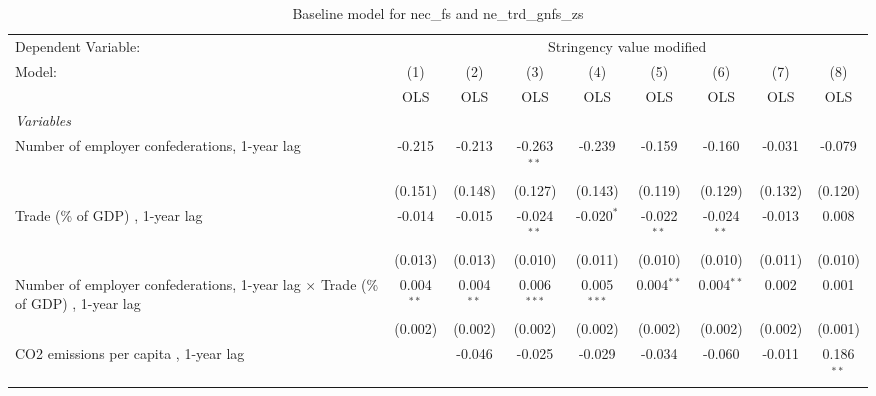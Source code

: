 
\begin{table}[htbp]
   \caption{Baseline model for nec\_fs and ne\_trd\_gnfs\_zs}
   \centering
   \begin{tabular}{lcccccccc}
      \toprule
      Dependent Variable: & \multicolumn{8}{c}{Stringency value modified}\\
      Model:                                                                                  & (1)          & (2)          & (3)           & (4)           & (5)           & (6)           & (7)          & (8)\\  
                                                                                              &  OLS         & OLS          & OLS           & OLS           & OLS           & OLS           & OLS          & OLS\\  
      \midrule
      \emph{Variables}\\
      Number of employer confederations, 1-year lag                                           & -0.215       & -0.213       & -0.263$^{**}$ & -0.239        & -0.159        & -0.160        & -0.031       & -0.079\\   
                                                                                              & (0.151)      & (0.148)      & (0.127)       & (0.143)       & (0.119)       & (0.129)       & (0.132)      & (0.120)\\   
      Trade (\% of GDP) , 1-year lag                                                          & -0.014       & -0.015       & -0.024$^{**}$ & -0.020$^{*}$  & -0.022$^{**}$ & -0.024$^{**}$ & -0.013       & 0.008\\   
                                                                                              & (0.013)      & (0.013)      & (0.010)       & (0.011)       & (0.010)       & (0.010)       & (0.011)      & (0.010)\\   
      Number of employer confederations, 1-year lag $\times$ Trade (\% of GDP) , 1-year lag   & 0.004$^{**}$ & 0.004$^{**}$ & 0.006$^{***}$ & 0.005$^{***}$ & 0.004$^{**}$  & 0.004$^{**}$  & 0.002        & 0.001\\   
                                                                                              & (0.002)      & (0.002)      & (0.002)       & (0.002)       & (0.002)       & (0.002)       & (0.002)      & (0.001)\\   
      CO2 emissions per capita , 1-year lag                                                   &              & -0.046       & -0.025        & -0.029        & -0.034        & -0.060        & -0.011       & 0.186$^{**}$\\   

\end{tabular}
\end{table}
